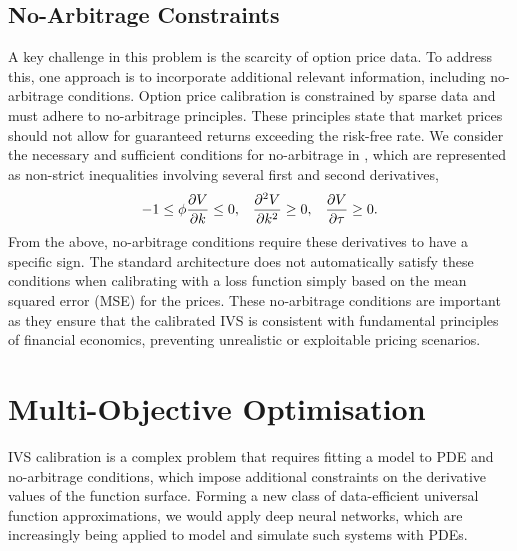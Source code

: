 \documentclass[sigconf, authorversion=true, nonacm=true]{acmart}
\begin{document}
\subsection{No-Arbitrage Constraints}
A key challenge in this problem is the scarcity of option price data. To address this, one approach is to incorporate additional relevant information, including no-arbitrage conditions. Option price calibration is constrained by sparse data and must adhere to no-arbitrage principles. These principles state that market prices should not allow for guaranteed returns exceeding the risk-free rate. We consider the necessary and sufficient conditions for no-arbitrage in \cite{carr2005note, ait2003nonparametric}, which are represented as non-strict inequalities involving several first and second derivatives,
\begin{equation}
    -1 \leq \phi\pdv{V}{k}\leq 0,\;\;\; \pdv[2]{V}{k} \geq 0,\;\;\;  \pdv{V}{\tau}\geq 0.
    \label{eq: no-arbitrage conditions}
\end{equation}
From the above, no-arbitrage conditions require these derivatives to have a specific sign. The standard architecture does not automatically satisfy these conditions when calibrating with a loss function simply based on the mean squared error (MSE) for the prices. These no-arbitrage conditions are important as they ensure that the calibrated IVS is consistent with fundamental principles of financial economics, preventing unrealistic or exploitable pricing scenarios.

\section{Multi-Objective Optimisation}
IVS calibration is a complex problem that requires fitting a model to PDE and no-arbitrage conditions, which impose additional constraints on the derivative values of the function surface. Forming a new class of data-efficient universal function approximations, we would apply deep neural networks, which are increasingly being applied to model and simulate such systems with PDEs.
\end{document}
